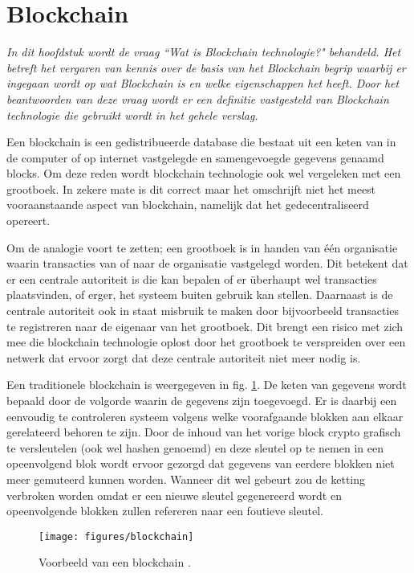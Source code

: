 \section{Blockchain}
\label{chapter:blockchain}

\textit{
  In dit hoofdstuk wordt de vraag  ``Wat is Blockchain technologie?" behandeld. Het betreft het vergaren van kennis over de basis van het Blockchain begrip waarbij er ingegaan wordt op wat Blockchain is en welke eigenschappen het heeft. Door het beantwoorden van deze vraag wordt er een definitie vastgesteld van Blockchain technologie die gebruikt wordt in het gehele verslag.
}

Een blockchain is een gedistribueerde database die bestaat uit een keten van in de computer of op internet vastgelegde en samengevoegde gegevens genaamd blocks. Om deze reden wordt blockchain technologie ook wel vergeleken met een grootboek. In zekere mate is dit correct maar het omschrijft niet het meest vooraanstaande aspect van blockchain, namelijk dat het gedecentraliseerd opereert.

Om de analogie voort te zetten; een grootboek is in handen van één organisatie waarin transacties van of naar de organisatie vastgelegd worden. Dit betekent dat er een centrale autoriteit is die kan bepalen of er überhaupt wel transacties plaatsvinden, of erger, het systeem buiten gebruik kan stellen. Daarnaast is de centrale autoriteit ook in staat misbruik te maken door bijvoorbeeld transacties te registreren naar de eigenaar van het grootboek. Dit brengt een risico met zich mee die blockchain technologie oplost door het grootboek te verspreiden over een netwerk dat ervoor zorgt dat deze centrale autoriteit niet meer nodig is.

Een traditionele blockchain is weergegeven in fig. \ref{blockchain_reference}. De keten van gegevens wordt bepaald door de volgorde waarin de gegevens zijn toegevoegd. Er is daarbij een eenvoudig te controleren systeem volgens welke voorafgaande blokken aan elkaar gerelateerd behoren te zijn. Door de inhoud van het vorige block crypto grafisch te versleutelen (ook wel hashen genoemd) en deze sleutel op te nemen in een opeenvolgend blok wordt ervoor gezorgd dat gegevens van eerdere blokken niet meer gemuteerd kunnen worden. Wanneer dit wel gebeurt zou de ketting verbroken worden omdat er een nieuwe sleutel gegenereerd wordt en opeenvolgende blokken zullen refereren naar een foutieve sleutel.
  
\begin{figure}[h]
  \texttt{[image: figures/blockchain]}
  \caption[Blockchain structuur]{
    Voorbeeld van een blockchain \citep{zheng2016blockchain}.
  }
  \label{blockchain_reference}
\end{figure}

